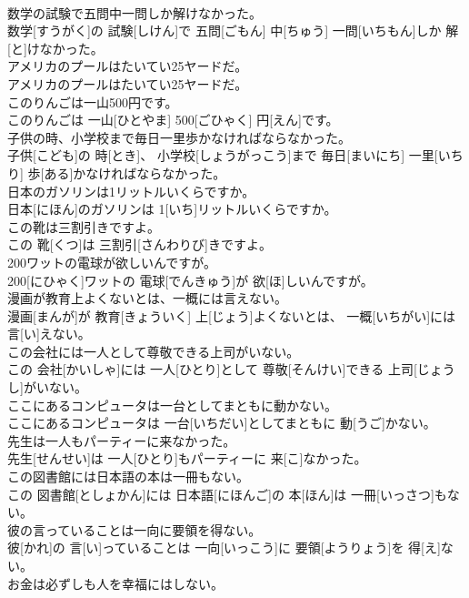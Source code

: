 \documentclass[8pt]{extreport}
\begin{document}
\begin{CJK}{UTF8}{min}
\\	数学の試験で五問中一問しか解けなかった。	
\\	数学[すうがく]の 試験[しけん]で 五問[ごもん] 中[ちゅう] 一問[いちもん]しか 解[と]けなかった。
\\	アメリカのプールはたいてい25ヤードだ。	
\\	アメリカのプールはたいてい25ヤードだ。
\\	このりんごは一山500円です。	
\\	このりんごは 一山[ひとやま] 500[ごひゃく] 円[えん]です。
\\	子供の時、小学校まで毎日一里歩かなければならなかった。	
\\	子供[こども]の 時[とき]、 小学校[しょうがっこう]まで 毎日[まいにち] 一里[いちり] 歩[ある]かなければならなかった。
\\	日本のガソリンは1リットルいくらですか。	
\\	日本[にほん]のガソリンは 1[いち]リットルいくらですか。
\\	この靴は三割引きですよ。	
\\	この 靴[くつ]は 三割引[さんわりび]きですよ。
\\	200ワットの電球が欲しいんですが。	
\\	200[にひゃく]ワットの 電球[でんきゅう]が 欲[ほ]しいんですが。
\\	漫画が教育上よくないとは、一概には言えない。	
\\	漫画[まんが]が 教育[きょういく] 上[じょう]よくないとは、 一概[いちがい]には 言[い]えない。
\\	この会社には一人として尊敬できる上司がいない。	
\\	この 会社[かいしゃ]には 一人[ひとり]として 尊敬[そんけい]できる 上司[じょうし]がいない。
\\	ここにあるコンピュータは一台としてまともに動かない。	
\\	ここにあるコンピュータは 一台[いちだい]としてまともに 動[うご]かない。
\\	先生は一人もパーティーに来なかった。	
\\	先生[せんせい]は 一人[ひとり]もパーティーに 来[こ]なかった。
\\	この図書館には日本語の本は一冊もない。	
\\	この 図書館[としょかん]には 日本語[にほんご]の 本[ほん]は 一冊[いっさつ]もない。
\\	彼の言っていることは一向に要領を得ない。	
\\	彼[かれ]の 言[い]っていることは 一向[いっこう]に 要領[ようりょう]を 得[え]ない。
\\	お金は必ずしも人を幸福にはしない。	

\end{CJK}
\end{document}
